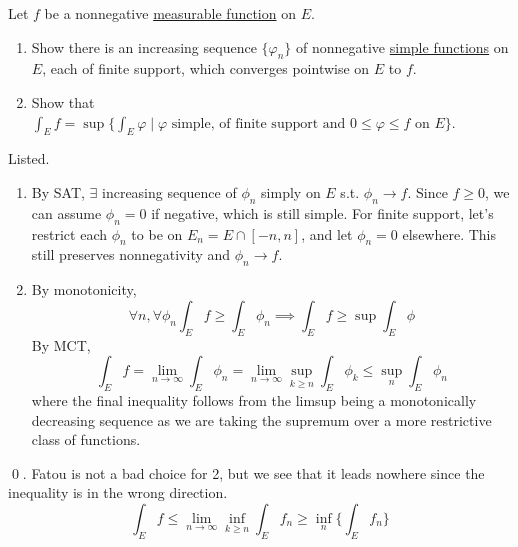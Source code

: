  \begin{exercise}[Royden 4.24]
    Let $f$ be a nonnegative \hyperref[def:measurable-function]{measurable function} on $E$.
    \begin{enumerate}
      \item Show there is an increasing sequence $\{\varphi_n\}$ of nonnegative \hyperref[def:simple-functions]{simple functions} on $E$, each of finite support, which converges pointwise on $E$ to $f$.
      \item Show that $\int_E f = \sup \{\int_E \varphi \mid \varphi \text{ simple, of finite support and } 0 \leq \varphi \leq f \text{ on } E\}$.
    \end{enumerate}
  \end{exercise}
  \begin{solution}
    Listed. 
    \begin{enumerate}
      \item By SAT, $\exists$ increasing sequence of $\phi_n$ simply on $E$ s.t. $\phi_n \to f$. Since $f \geq 0$, we can assume $\phi_n = 0$ if negative, which is still simple. For finite support, let's restrict each $\phi_n$ to be on $E_n = E \cap [-n, n]$, and let $\phi_n = 0$ elsewhere. This still preserves nonnegativity and $\phi_n \to f$. 
      \item By monotonicity, 
        \begin{equation}
          \forall n, \forall \phi_n \int_E f \geq \int_E \phi_n \implies \int_E f \geq \sup \int_E \phi
        \end{equation}
        By MCT, 
        \begin{equation}
          \int_E f = \lim_{n \to \infty} \int_E \phi_n = \lim_{n \to \infty} \sup_{k \geq n} \int_E \phi_k \leq \sup_n \int_E \phi_n
        \end{equation}
        where the final inequality follows from the limsup being a monotonically decreasing sequence as we are taking the supremum over a more restrictive class of functions.  
    \end{enumerate}
    \qed. Fatou is not a bad choice for 2, but we see that it leads nowhere since the inequality is in the wrong direction. 
    \begin{equation}
      \int_E f \leq \lim_{n \to \infty} \inf_{k \geq n} \int_E f_n \geq \inf_n \bigg\{ \int_E f_n \bigg\}
    \end{equation}
  \end{solution}

